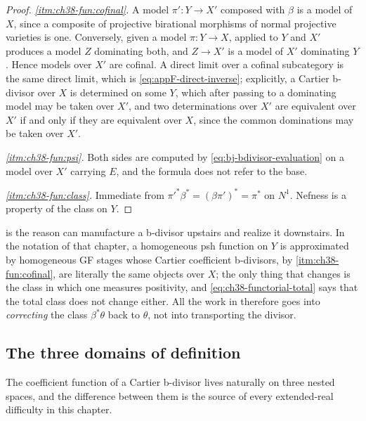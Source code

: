 \begin{proof}
\emph{\cref{itm:ch38-fun:cofinal}.}  A model $\pi':Y\to X'$ composed with
$\beta$ is a model of $X$, since a composite of projective birational
morphisms of normal projective varieties is one.  Conversely, given a model
$\pi:Y\to X$,  applied to $Y$ and
$X'$ produces a model $Z$ dominating both, and $Z\to X'$ is a model of
$X'$ dominating $Y$.  Hence models over $X'$ are cofinal.  A direct
limit over a cofinal subcategory is the same direct limit, which is
\eqref{eq:appF-direct-inverse}; explicitly, a Cartier b-divisor over $X$
is determined on some $Y$, which after passing to a dominating model may
be taken over $X'$, and two determinations over $X'$ are equivalent over
$X'$ if and only if they are equivalent over $X$, since the common
dominations may be taken over $X'$.

\emph{\cref{itm:ch38-fun:psi}.}  Both sides are computed by
\eqref{eq:bj-bdivisor-evaluation} on a model over $X'$ carrying $E$,
and the formula does not refer to the base.

\emph{\cref{itm:ch38-fun:class}.}  Immediate from
$\pi'^*\beta^*=(\beta\pi')^*=\pi^*$ on $N^1$.  Nefness is a property of
the class on $Y$.
\end{proof}

\begin{remark}
\label{rem:ch38-functorial-use}
 is the reason
 can manufacture a b-divisor upstairs and realize
it downstairs.  In the notation of that chapter, a homogeneous psh function
on $Y$ is approximated by homogeneous GF stages whose Cartier
coefficient b-divisors, by
\cref{itm:ch38-fun:cofinal}, are literally the same objects over $X$; the
only thing that changes is the class in which one measures positivity, and
\eqref{eq:ch38-functorial-total} says that the total class does not change
either.  All the work in  therefore goes into
\emph{correcting} the class $\beta^*\theta$ back to $\theta$, not into
transporting the divisor.
\end{remark}

\subsection{The three domains of definition}
\label{sec:ch38-domains}

The coefficient function of a Cartier b-divisor lives naturally on three
nested spaces, and the difference between them is the source of every
extended-real difficulty in this chapter.

